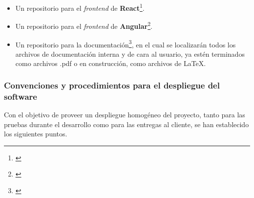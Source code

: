 \documentclass[11pt, a4paper, titlepage]{article}
\begin{document}
\begin{itemize}
\begin{itemize}
        \item Un repositorio para el \textit{frontend} de \textbf{React}\footnote{\href{https://github.com/UNIZAR-30226-2022-01/proyecto_software_frontend_react}{}}.

        \item Un repositorio para el \textit{frontend} de \textbf{Angular}\footnote{\href{https://github.com/UNIZAR-30226-2022-01/proyecto_software_frontend_angular}{}}.

        \item Un repositorio para la documentación\footnote{\href{https://github.com/UNIZAR-30226-2022-01/proyecto_software_documentacion}{\color{blue}{Repositorio de documentación}}}, en el cual se localizarán todos los archivos de documentación interna y de cara al usuario, ya estén terminados como archivos .pdf o en construcción, como archivos de \LaTeX.
    \end{itemize}


\end{itemize}

\subsubsection{Convenciones y procedimientos para el despliegue del software}

Con el objetivo de proveer un despliegue homogéneo del proyecto, tanto para las pruebas durante el desarrollo como para las entregas al cliente, se han establecido los siguientes puntos.
\end{document}
